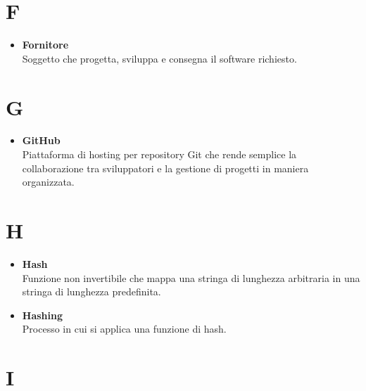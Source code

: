 \documentclass[a4paper,12pt]{article}
\begin{document}
        \section*{F} {
            \begin{itemize}
                \item \textbf{Fornitore}\\
                    Soggetto che progetta, sviluppa e consegna il software richiesto.
            \end{itemize}
        }
        \newpage

        \section*{G} {
            \begin{itemize}
                \item \textbf{GitHub}\\
                    Piattaforma di hosting per repository Git che rende semplice la collaborazione tra sviluppatori e la gestione di progetti in maniera organizzata.
            \end{itemize}
        }
        \newpage

        \section*{H} {
            \begin{itemize}
                \item \textbf{Hash}\\
                    Funzione non invertibile che mappa una stringa di lunghezza arbitraria in una stringa di lunghezza predefinita.
                \item \textbf{Hashing}\\
                    Processo in cui si applica una funzione di hash.
            \end{itemize}
        }
        \newpage

        \section*{I} {
            
        }
        \newpage
\end{document}
